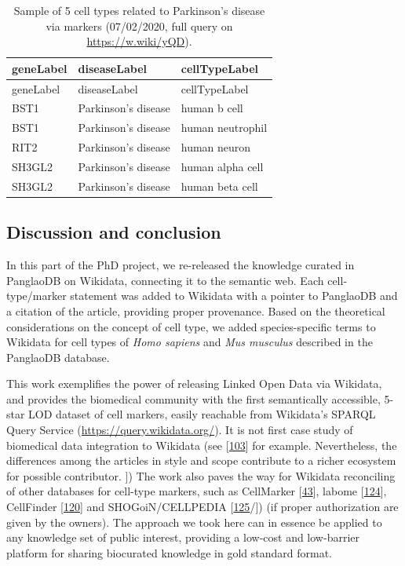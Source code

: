 \begin{longtable}[]{@{}lll@{}}
\caption{Sample of 5 cell types related to Parkinson's disease via markers (07/02/2020, full query on \url{https://w.wiki/yQD}).
\label{tbl:parkinson}}\tabularnewline
\toprule
geneLabel & diseaseLabel & cellTypeLabel \\
\midrule
\endfirsthead
\toprule
geneLabel & diseaseLabel & cellTypeLabel \\
\midrule
\endhead
BST1 & Parkinson's disease & human b cell \\
BST1 & Parkinson's disease & human neutrophil \\
RIT2 & Parkinson's disease & human neuron \\
SH3GL2 & Parkinson's disease & human alpha cell \\
SH3GL2 & Parkinson's disease & human beta cell \\
\bottomrule
\end{longtable}

\hypertarget{discussion-and-conclusion}{%
\subsection{Discussion and conclusion}\label{discussion-and-conclusion}}

In this part of the PhD project, we re-released the knowledge curated in PanglaoDB on Wikidata, connecting it to the semantic web.
Each cell-type/marker statement was added to Wikidata with a pointer to PanglaoDB and a citation of the article, providing proper provenance.
Based on the theoretical considerations on the concept of cell type, we added species-specific terms to Wikidata for cell types of \emph{Homo sapiens} and \emph{Mus musculus} described in the PanglaoDB database.

This work exemplifies the power of releasing Linked Open Data via Wikidata, and provides the biomedical community with the first semantically accessible, 5-star LOD dataset of cell markers, easily reachable from Wikidata's SPARQL Query Service (\url{https://query.wikidata.org/}).
It is not first case study of biomedical data integration to Wikidata (see {[}\protect\hyperlink{ref-mPoPwN77}{103}{]} for example.
Nevertheless, the differences among the articles in style and scope contribute to a richer ecosystem for possible contributor.
{]})
The work also paves the way for Wikidata reconciling of other databases for cell-type markers, such as CellMarker {[}\protect\hyperlink{ref-chGii6yw}{43}{]}, labome {[}\protect\hyperlink{ref-rhRRCtlA}{124}{]}, CellFinder {[}\protect\hyperlink{ref-4AEy2xhQ}{120}{]} and SHOGoiN/CELLPEDIA {[}\protect\hyperlink{ref-6uWWsiSq}{125}/{]}) (if proper authorization are given by the owners).
The approach we took here can in essence be applied to any knowledge set of public interest, providing a low-cost and low-barrier platform for sharing biocurated knowledge in gold standard format.


